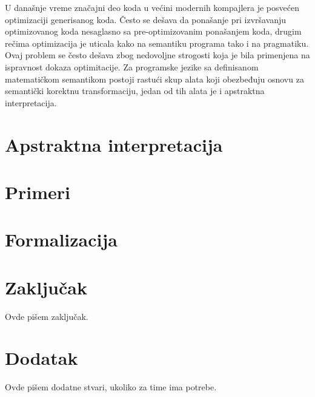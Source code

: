 \documentclass[a4paper]{article}
\begin{document}
U današnje vreme značajni deo koda u većini modernih kompajlera je posvećen optimizaciji generisanog koda. Često se dešava da ponašanje pri izvršavanju optimizovanog koda nesaglasno sa pre-optimizovanim ponašanjem koda, drugim rečima optimizacija je uticala kako na semantiku programa tako i na pragmatiku. Ovaj problem se često dešava zbog nedovoljne strogosti koja je bila primenjena na ispravnost dokaza optimitacije. Za programske jezike sa definisanom matematičkom semantikom postoji rastući skup alata koji obezbeđuju osnovu za semantički korektnu transformaciju, jedan od tih alata je i apstraktna interpretacija. \cite{AbramskyHankin} \\



\section{Apstraktna interpretacija}
\label{sec:Apstraktna interpretacija}





\section{Primeri}
\label{sec:Primeri}


\newpage
\section{Formalizacija} 
\label{sec:Formalizacija}


\section{Zaključak}
\label{sec:zakljucak}

Ovde pišem zaključak. 


\appendix
 


\appendix
\section{Dodatak}
Ovde pišem dodatne stvari, ukoliko za time ima potrebe.
\end{document}
